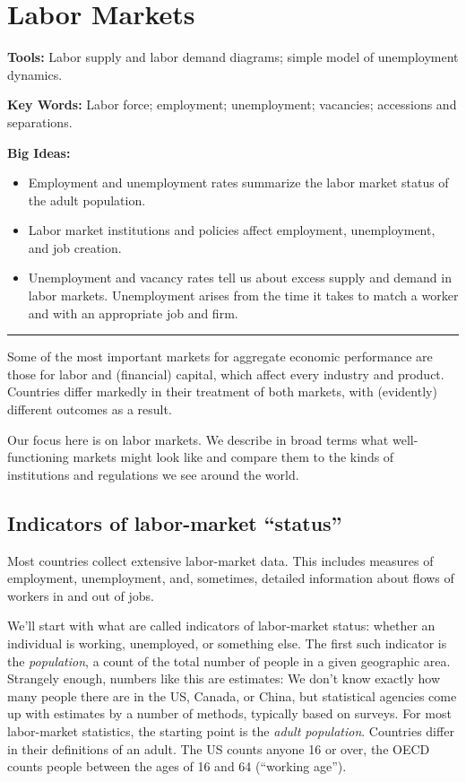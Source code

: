 \chapter{Labor Markets}\label{chp:lbmk}
\hypertarget{labor}{}
\label{ch:labor}

\textbf{Tools: }Labor supply and labor demand diagrams; simple model of unemployment dynamics.

\textbf{Key Words:} Labor force; employment; unemployment; vacancies; accessions and separations.

\textbf{Big Ideas:}
\vspace{-0.1in}
\begin{itemize}
\item Employment and unemployment rates summarize the labor market status of the adult population.

\item Labor market institutions and policies affect employment, unemployment, and job creation.

\item Unemployment and vacancy rates tell us about excess supply and demand in labor markets. Unemployment arises from the time it takes to match a worker and with an appropriate job and firm.

\end{itemize}
\rule{\textwidth}{1pt}

Some of the most important markets for aggregate economic performance
are those for labor and (financial) capital,
which affect every industry and product.
Countries differ markedly in their treatment of both markets,
with (evidently) different outcomes as a result.

Our focus here is on labor markets.
We describe in broad terms what well-functioning markets might look like
and compare them to the kinds of institutions and regulations we see around the world.


\section{Indicators of labor-market ``status''}

Most countries collect extensive labor-market data.
This includes measures of employment, unemployment,
and, sometimes, detailed information about flows of workers
in and out of jobs.

We'll start with what are called indicators of labor-market status:
whether an individual is working, unemployed, or something else.
The first such indicator is the {\it population\/},
a count of the total number of people in a given geographic area.
Strangely enough, numbers like this are estimates: We don't know exactly how many people there are in
the US, Canada, or China, but statistical agencies come up
with estimates by a number of methods, typically based on surveys.
For most labor-market statistics,
the starting point is the
{\it adult population\/}.
Countries differ in their definitions of an adult.
The US counts anyone 16 or over,
the OECD counts people between the ages of 16 and 64
(``working age'').

